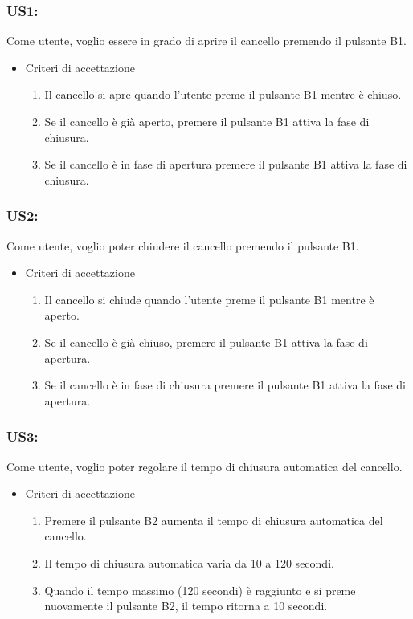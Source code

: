 \documentclass[12pt]{article}
\begin{document}
\subsubsection{US1:}
Come utente, voglio essere in grado di aprire il cancello premendo il pulsante B1.
\begin{itemize}
    \item Criteri di accettazione
    \begin{enumerate}
        \item Il cancello si apre quando l'utente preme il pulsante B1 mentre è chiuso.
        \item Se il cancello è già aperto, premere il pulsante B1 attiva la fase di chiusura.
        \item Se il cancello è in fase di apertura premere il pulsante B1 attiva la fase di chiusura.
    \end{enumerate}
\end{itemize}
\subsubsection{US2:}
Come utente, voglio poter chiudere il cancello premendo il pulsante B1.
\begin{itemize}
    \item Criteri di accettazione
    \begin{enumerate}
        \item Il cancello si chiude quando l'utente preme il pulsante B1 mentre è aperto.
        \item Se il cancello è già chiuso, premere il pulsante B1 attiva la fase di apertura.
        \item Se il cancello è in fase di chiusura premere il pulsante B1 attiva la fase di apertura.
    \end{enumerate}
\end{itemize}
\subsubsection{US3:}
Come utente, voglio poter regolare il tempo di chiusura automatica del cancello.
\begin{itemize}
    \item Criteri di accettazione
    \begin{enumerate}
        \item Premere il pulsante B2 aumenta il tempo di chiusura automatica del cancello.
        \item Il tempo di chiusura automatica varia da 10 a 120 secondi.
        \item Quando il tempo massimo (120 secondi) è raggiunto e si preme nuovamente il pulsante B2, il tempo ritorna a 10 secondi.
    \end{enumerate}
\end{itemize}
\end{document}
